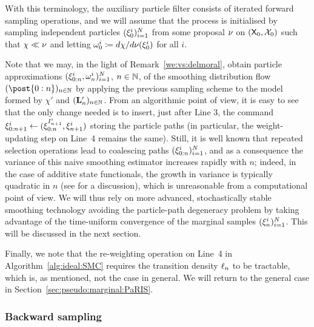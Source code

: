 With this terminology, the auxiliary particle filter consists of iterated forward sampling operations, and we will assume that the process is initialised by sampling independent particles $(\xi_{0}^{i})_{i = 1}^N$ from some proposal $\nu$ on $(\mathsf{X}_0, \mathcal{X}_0)$ such that $\chi \ll \nu$ and letting $\omega_{0}^{i} \coloneqq d \chi / d \nu(\xi_{0}^{i})$ for all $i$. 

Note that we may, in the light of Remark~\ref{we:vs:delmoral},  obtain particle approximations $(\xi_{0:n}^{i}, \omega_{n}^{i})_{i = 1}^N$, $n \in \mathbb{N}$, of the smoothing distribution flow $(\post{0:n})_{n \in \nset}$ by applying the previous sampling scheme to the model formed by $\chi'$ and $(\mathbf{L}_{n}')_{n \in \mathbb{N}}$. From an algorithmic point of view, it is easy to see that the only change needed is to insert, just after Line 3, the command $\xi_{0:n + 1}^{i} \gets (\xi_{0:n}^{I_{n + 1}^{i}}, \xi_{n + 1}^{i})$ storing the particle paths (in particular, the weight-updating step on Line~4 remains the same). Still, it is well known that repeated selection operations lead to coalescing paths $(\xi_{0:n}^{i})_{i = 1}^N$, and as a consequence the variance of this naive smoothing estimator increases rapidly with $n$; indeed, in the case of additive state functionals, the growth in variance is typically quadratic in $n$ (see \cite{olsson:westerborn:2014b} for a discussion), which is unreasonable from a computational point of view. We will thus rely on more advanced, stochastically stable smoothing technology avoiding the particle-path degeneracy problem by taking advantage of the time-uniform convergence of the marginal samples $(\xi_{n}^{i})_{i = 1}^N$. This will be discussed in the next section. 

Finally, we note that the re-weighting operation on Line~4 in Algorithm~\ref{alg:ideal:SMC} requires the transition density $\ell_{n}$ to be tractable, which is, as mentioned, not the case in general. We will return to the general case in Section~\ref{sec:pseudo:marginal:PaRIS}. 


\subsubsection{Backward sampling} 
\label{sec:BS}

